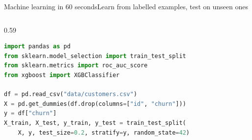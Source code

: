 \documentclass[aspectratio=169,11pt]{beamer}
\begin{document}
\begin{frame}[fragile]{Machine learning in 60 seconds}{Learn from labelled examples, test on unseen ones}
  \vspace{2pt}
  \begin{columns}[T]
    \begin{column}{0.59\textwidth}
\begin{lstlisting}[language=Python,aboveskip=0pt]
import pandas as pd
from sklearn.model_selection import train_test_split
from sklearn.metrics import roc_auc_score
from xgboost import XGBClassifier

df = pd.read_csv("data/customers.csv")
X = pd.get_dummies(df.drop(columns=["id", "churn"]))
y = df["churn"]
X_train, X_test, y_train, y_test = train_test_split(
    X, y, test_size=0.2, stratify=y, random_state=42)


\end{lstlisting}
\end{column}
\end{columns}
\end{frame}
\end{document}
